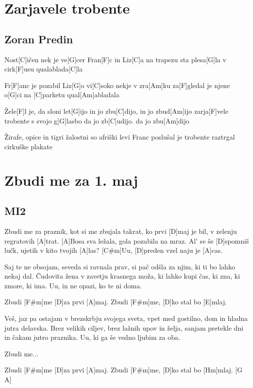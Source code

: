 \documentclass[a4paper,12pt]{article}
\begin{document}
\begin{multicols}{2}
\section{Zarjavele trobente}
\subsection*{Zoran Predin}
\begin{guitar}

Nost[C]ičen nek je ve[G]cer 
Fran[F]c in Liz[C]a 
na trapezu sta plesa[G]la
v cirk[F]usu qualablada[C]la 


Fr[F]anc je pozabil Liz[G]o 
vi[C]soko nekje v zra[Am]ku 
za[F]gledal je njene o[G]ci 
na [C]parketu qual[Am]abladala 


Žele[F]l je, da sloni let[G]ijo 
in jo zbu[C]dijo, in jo zbud[Am]ijo 
zarja[F]vele trobente s svojo g[G]lasbo 
da jo zb[C]udijo. da jo zbu[Am]dijo 


Žirafe, opice in tigri 
žalostni so afriški levi 
Franc poslušal je trobente 
raztrgal cirkuške plakate 

\end{guitar}
\section{Zbudi me za 1. maj}
\subsection*{MI2}
\begin{guitar}
[A]Zbudi me za praznik, kot si me zbujala takrat,
ko prvi [D]maj je bil, v zelenju regratovih [A]trat.
[A]Bosa sva ležala, gola pozabila na mraz.
Al' se še [D]spomniš lučk, ujetih v kito tvojih [A]las?
[C#m]Uu, [D]preden vzel naju je [A]cas.


Saj te ne obsojam, seveda si ravnala prav,
si pač odšla za njim, ki ti bo lahko nekaj dal.
Čudovita žena v zavetju krasnega moža,
ki lahko kupi čas, ki zna, ki zmore, ki ima.
Uu, in ne opazi, ko te ni doma.


Zbudi [F#m]me [D]za prvi [A]maj.
Zbudi [F#m]me, [D]ko stal bo [E]mlaj.


Veš, jaz pa ostajam v brezskrbju svojega sveta,
vpet med gostilno, dom in hladna jutra delavska.
Brez velikih ciljev, brez lažnih upov in želja,
sanjam pretekle dni in čakam jutro praznika.
Uu, ki ga še vedno ljubim za oba.


Zbudi me...


Zbudi [F#m]me [D]za prvi [A]maj.
Zbudi [F#m]me, [D]ko stal bo [Hm]mlaj. [G A]



\end{guitar}
\end{multicols}
\end{document}
